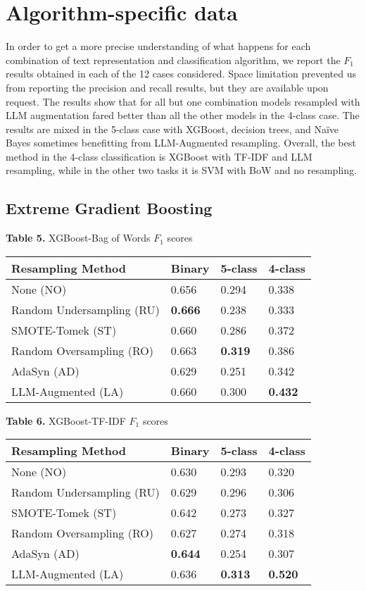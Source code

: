 \documentclass[runningheads]{llncs}
\newenvironment{nscenter}
 {\parskip=0pt\par\nopagebreak\centering}
 {\par\noindent\ignorespacesafterend}
\begin{document}
\appendix
\section{Algorithm-specific data}
In order to get a more precise understanding of what happens for each combination of text representation and classification algorithm, we report the $F_1$ results obtained in each of the 12 cases considered. Space limitation prevented us from reporting the precision and recall results, but they are available upon request. The results show that for all but one combination models resampled with LLM augmentation fared better than all the other models in the 4-class case. The results are mixed in the 5-class case with XGBoost, decision trees, and Naïve Bayes sometimes benefitting from LLM-Augmented resampling. Overall, the best method in the 4-class classification is XGBoost with TF-IDF and LLM resampling, while in the other two tasks it is SVM with BoW and no resampling.

\subsection{Extreme Gradient Boosting}
\begin{nscenter}
{\bf Table 5.} XGBoost-Bag of Words $F_1$ scores\\

\begin{tabular}{|l|l|l|l|}
\hline
Resampling Method & Binary & 5-class & 4-class \\\hline
None (NO) & 0.656 & 0.294  & 0.338 \\\hline
Random Undersampling (RU) & {\bf 0.666} & 0.238 & 0.333 \\\hline
SMOTE-Tomek (ST) & 0.660 & 0.286 & 0.372 \\\hline
Random Oversampling (RO) & 0.663 & {\bf 0.319} & 0.386 \\\hline
AdaSyn (AD) & 0.629 & 0.251 & 0.342 \\\hline
LLM-Augmented (LA) & 0.660 & 0.300 & {\bf 0.432} \\\hline
\end{tabular}
\end{nscenter}

\begin{nscenter}
{\bf Table 6.} XGBoost-TF-IDF $F_1$ scores\\

\begin{tabular}{|l|l|l|l|}
\hline
Resampling Method & Binary & 5-class & 4-class \\\hline
None (NO) & 0.630 & 0.293 & 0.320 \\\hline
Random Undersampling (RU) & 0.629 & 0.296 & 0.306 \\\hline
SMOTE-Tomek (ST) & 0.642 & 0.273 & 0.327 \\\hline
Random Oversampling (RO) & 0.627 & 0.274 & 0.318 \\\hline
AdaSyn (AD) & {\bf 0.644} & 0.254 & 0.307 \\\hline
LLM-Augmented (LA) & 0.636 & {\bf 0.313} & {\bf 0.520} \\\hline
\end{tabular}
\end{nscenter}
\end{document}
